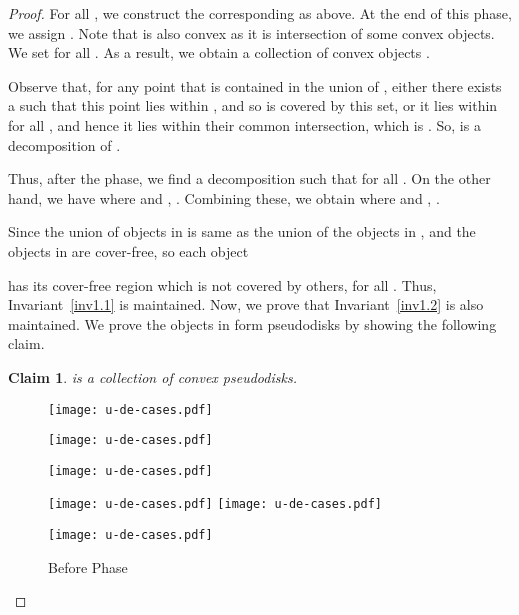 \documentclass[a4paper,11pt]{article}
\newtheorem{claim}{Claim}
\begin{document}
\begin{proof}
For all , we 
construct the corresponding  as above. 
At the end of this phase, we assign . Note  that  is also convex as it is intersection of some convex objects.
We  set   for 
all .  As a result, we obtain a collection of convex objects  .

Observe that, for any point  that is contained in the union of , either there exists a  such that this point lies within , and so is covered by this set, or it lies within  for all , and hence it lies within their common intersection, which is . So,   is a decomposition of .

Thus, after the 
 phase, 
we find a decomposition   such that 
 for 
all 
. On the other hand, we have 
 where  and , . Combining these,  we obtain   where  and , .

Since the union of objects 
in    is same as the 
union of the  objects in  , and the 
objects in  are cover-free,  so each object  

has its cover-free region   which is not covered by others, for all .  Thus, 
Invariant~\ref{inv1.1} is maintained.
Now, we prove that Invariant~\ref{inv1.2} is also 
maintained.
We prove the objects in 
 form pseudodisks by showing the 
following claim.

\begin{claim}\label{C1}
 is a collection of convex pseudodisks.
\end{claim}


\begin{figure}
  \centering
  \begin{minipage}{.4\linewidth}
    \centering
      {\texttt{[image: u-de-cases.pdf]}}

      {\texttt{[image: u-de-cases.pdf]}}


      {\texttt{[image: u-de-cases.pdf]}}
\caption*{Before Phase }
  \end{minipage}\quad
   \begin{minipage}{.4\linewidth}
    \centering

      {\texttt{[image: u-de-cases.pdf]}}
      {\texttt{[image: u-de-cases.pdf]}}


      {\texttt{[image: u-de-cases.pdf]}}



\end{minipage}
\end{figure}
\end{proof}
\end{document}
